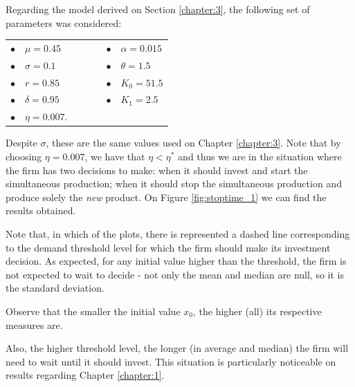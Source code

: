 Regarding the model derived on Section \ref{chapter:3}, the following set of parameters was considered:
\begin{table}[!htb]
	\centering
	\begin{tabular}{lllllll}
		$\bullet$ & $\mu=0.45$     &  & \hspace{7cm} &  &  $\bullet$ & $\alpha=0.015$ \\
		$\bullet$ & $\sigma=0.1$ &  & \hspace{7cm} &  &  $\bullet$ & $\theta=1.5$   \\
		$\bullet$ & $r=0.85$       &  & \hspace{7cm} &  &  $\bullet$ & $K_0=51.5$       \\
		$\bullet$ & $\delta=0.95$     &  & \hspace{7cm} & &  $\bullet$ & $K_1=2.5$  		\\
		$\bullet$ & $\eta=0.007$.     
	\end{tabular}
\end{table}

Despite $\sigma$, these are the same values used on Chapter \ref{chapter:3}. Note that by choosing $\eta=0.007$, we have that $\eta< \eta^*$ and thus we are in the situation where the firm has two decisions to make: when it should invest and start the simultaneous production; when it should stop  the simultaneous production and produce solely the \textit{new} product.
On Figure \ref{fig:stoptime_1} we can find the results obtained.

Note that, in which of the plots, there is represented a dashed line corresponding to the demand threshold level for which the firm should make its investment decision. As expected, for any initial value higher than the threshold,
the firm is not expected to wait to decide
- not only the mean and median are null, so it is the standard deviation.


Observe that the smaller the initial value $x_0$, the higher (all) its respective measures are. 

Also, the higher threshold level, the longer (in average and median) the firm will need to wait until it should invest. This situation is particularly noticeable on results regarding Chapter \ref{chapter:1}.

